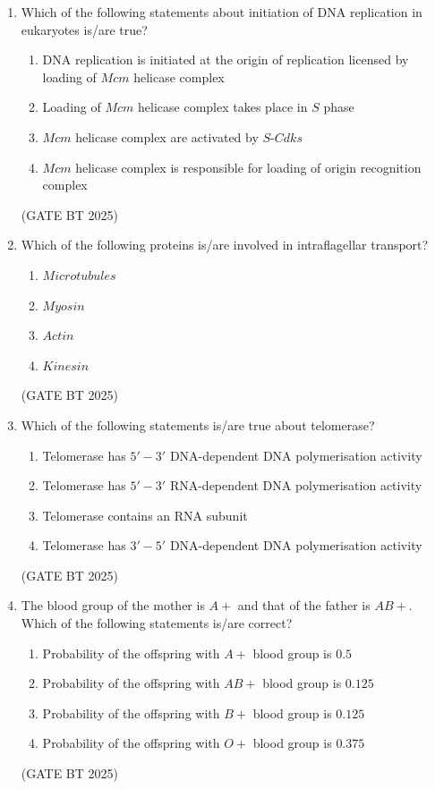 \documentclass[journal,12pt,onecolumn]{IEEEtran}
\theoremstyle{remark}
\begin{document}
\begin{enumerate}
\item Which of the following statements about initiation of DNA replication in eukaryotes is/are true?

\begin{enumerate}
    \item DNA replication is initiated at the origin of replication licensed by loading of $Mcm$ helicase complex
    \item Loading of $Mcm$ helicase complex takes place in $S$ phase
    \item $Mcm$ helicase complex are activated by $S$-$Cdks$
    \item $Mcm$ helicase complex is responsible for loading of origin recognition complex
\end{enumerate}
\hfill (GATE BT 2025)

\item Which of the following proteins is/are involved in intraflagellar transport?
\begin{multicols}{2}
\begin{enumerate}
    \item $Microtubules$
    \item $Myosin$
    \item $Actin$
    \item $Kinesin$
\end{enumerate}
\end{multicols}
\hfill (GATE BT 2025)

\item Which of the following statements is/are true about telomerase?

\begin{enumerate}
    \item Telomerase has $5'\!-\!3'$ DNA-dependent DNA polymerisation activity
    \item Telomerase has $5'\!-\!3'$ RNA-dependent DNA polymerisation activity
    \item Telomerase contains an RNA subunit
    \item Telomerase has $3'\!-\!5'$ DNA-dependent DNA polymerisation activity
\end{enumerate}
\hfill (GATE BT 2025)

\item The blood group of the mother is $A+$ and that of the father is $AB+$. Which of the following statements is/are correct?

\begin{enumerate}
    \item Probability of the offspring with $A+$ blood group is $0.5$
    \item Probability of the offspring with $AB+$ blood group is $0.125$
    \item Probability of the offspring with $B+$ blood group is $0.125$
    \item Probability of the offspring with $O+$ blood group is $0.375$
\end{enumerate}
\hfill (GATE BT 2025)


\end{enumerate}
\end{document}
